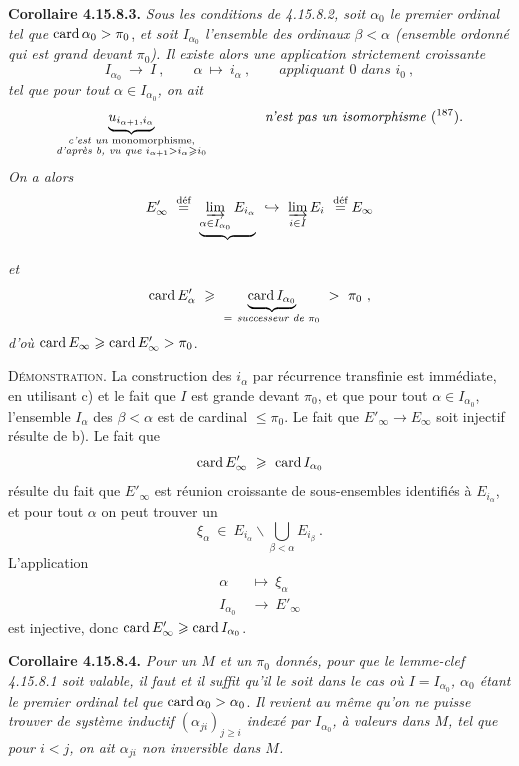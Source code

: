 \textbf{Corollaire 4.15.8.3.} \textit{Sous les conditions de 4.15.8.2, soit $\alpha_0$ le premier ordinal tel que} $\operatorname{card} \alpha_0 > \pi_0$, \textit{et soit $I_{\alpha_0}$ l'ensemble des ordinaux $\beta < \alpha$ (ensemble ordonné qui est grand devant $\pi_0$). Il existe alors une application strictement croissante}
\[
I_{\alpha_0} \ \longrightarrow \ I \ , \qquad \alpha \ \longmapsto \ i_\alpha \ , \qquad \textit{appliquant } 0 \textit{ dans } i_0 \ ,
\]
\textit{tel que pour tout $\alpha \in I_{\alpha_0}$, on ait}
\[
\underbrace{u_{i_{\alpha+1},i_\alpha}}_{\substack{\textit{c'est un } \text{monomorphisme,}\\ \textit{d'après b, vu que } i_{\alpha+1} > i_\alpha \geqslant i_0}} \qquad\qquad \text{\textit{n'est pas un isomorphisme} (\footnotemark[187]).}
\]
\textit{On a alors}
\[
E'_\infty \ \overset{\text{déf}}{=} \ \underbrace{\varinjlim_{\alpha\in I_{\alpha_0}} E_{i_\alpha}}_{} \ \hookrightarrow \ \varinjlim_{i\in I} E_i \ \overset{\text{déf}}{=} E_\infty
\]
\textit{et}
\[
\card E'_\alpha \ \geqslant \ \underbrace{\card I_{\alpha_0}}_{=\ \textit{successeur de } \pi_0} \ > \ \pi_0 \ ,
\] %
\textit{d'où} $\operatorname{card} E_\infty \geqslant \operatorname{card} E'_\infty > \pi_0$.

\textsc{Démonstration}. La construction des $i_\alpha$ par récurrence transfinie est immédiate, en utilisant c) et le fait que $I$ est grande devant $\pi_0$, et que pour tout $\alpha \in I_{\alpha_0}$, l'ensemble $I_\alpha$
des $\beta < \alpha$ est de cardinal $\leqslant \pi_0$. Le fait que $E'_\infty \longrightarrow E_\infty$ soit injectif résulte de b). Le fait que
\[
\operatorname{card} E'_\infty \ \geqslant \ \operatorname{card} I_{\alpha_0}
\]
résulte du fait que $E'_\infty$ est réunion croissante de sous-ensembles identifiés à $E_{i_\alpha}$, et pour tout
$\alpha$ on peut trouver un
\[
\xi_\alpha \ \in \ E_{i_\alpha}\backslash \bigcup_{\beta<\alpha} E_{i_\beta} \ .
\]
L'application
\[
\begin{aligned}
\alpha \ &\longmapsto \ \xi_\alpha\\
I_{\alpha_0} \ &\longrightarrow \ E'_\infty
\end{aligned}
\]
est injective, donc $\operatorname{card} E'_\infty \geqslant \operatorname{card} I_{\alpha_0}$.

\textbf{Corollaire 4.15.8.4.} \textit{Pour un $M$ et un $\pi_0$ donnés, pour que le lemme-clef 4.15.8.1 soit valable, il faut et il suffit qu'il le soit dans le cas où $I = I_{\alpha_0}$, $\alpha_0$ étant le premier ordinal tel que} $\operatorname{card} \alpha_0 > \alpha_0$. \textit{Il revient au même qu'on ne puisse trouver de système inductif $(\alpha_{ji})_{j\geqslant i}$ indexé par $I_{\alpha_0}$, à valeurs dans $M$, tel que pour $i < j$, on ait $\alpha_{ji}$ non inversible dans $M$.} %

